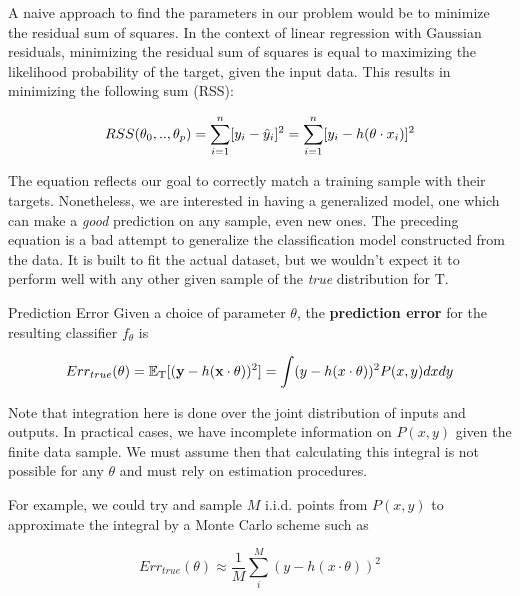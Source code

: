 A naive approach to find the parameters in our problem would be to minimize the residual sum of squares. In the context of linear regression with Gaussian residuals, minimizing the residual sum of squares is equal to maximizing the likelihood probability of the target, given the input data. This results in minimizing the following sum (RSS):

\begin{equation} \label{eq:rss}
RSS(\theta_0,..,\theta_p) = \sum_{i=1}^n [y_i - \hat{y}_i]^2 \\
= \sum_{i=1}^n [y_i - h( \theta \cdot x_i)]^2
\end{equation}

The equation reflects our goal to correctly match a training sample with their targets. Nonetheless, we are interested in having a generalized model, one which can make a \textit{good} prediction on any sample, even new ones. The preceding equation is a bad attempt to generalize the classification model constructed from the data. It is built to fit the actual dataset, but we wouldn't expect it to perform well with any other given sample of the \textit{true} distribution for $\mathrm{T}$.

\begin{definition}{Prediction Error}
Given a choice of parameter $\theta$, the \textbf{prediction error} for the resulting classifier $f_\theta$ is

\begin{equation}
  Err_{true}(\theta) = \operatorname{\mathbb{E}}_{ \mathrm{T}}[(\textbf{y} - h(\textbf{x} \cdot \theta) )^2] \\
  = \int (y - h(x \cdot \theta) )^2 P(x,y)dxdy
\end{equation}

\end{definition}

Note that integration here is done over the joint distribution of inputs and outputs. In practical cases, we have incomplete information on $P(x,y)$ given the finite data sample.
We must assume then that calculating this integral is not possible for any $\theta$ and must rely on estimation procedures.

For example, we could try and sample $M$ i.i.d. points from $P(x,y)$ to approximate the integral by a Monte Carlo scheme such as

\begin{equation} \label{eq:mcarlo-approx}
  Err_{true}(\theta) \approx \frac{1}{M} \sum_i^M ( y - h(x \cdot \theta) )^2
\end{equation}

